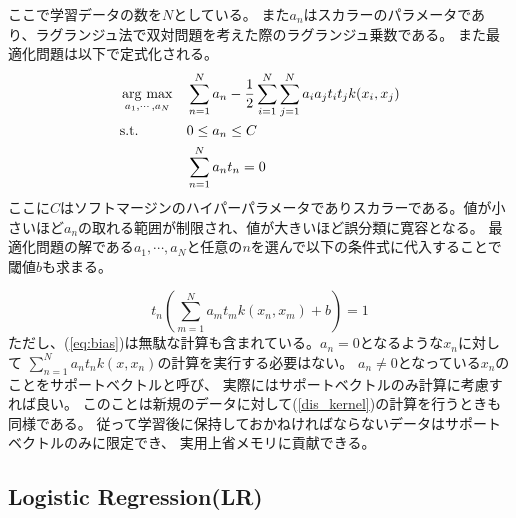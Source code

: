 ここで学習データの数を\(N\)としている。
また\(a_n\)はスカラーのパラメータであり、ラグランジュ法で双対問題を考えた際のラグランジュ乗数である。
また最適化問題は以下で定式化される。
\begin{equation}
    \begin{aligned}
    & \mathop{\rm arg~max}\limits_{a_1,\cdots,a_N}
    & & \sum_{n=1}^N a_n - \frac{1}{2}\sum_{i=1}^N \sum_{j=1}^N a_ia_jt_it_jk(x_i,x_j) \\
    & \text{s.t.}
    & & 0 \leq a_n \leq C  \\
    & & &  \sum_{n=1}^N a_nt_n=0
    \end{aligned}
    \label{eq:kernel SVM}
\end{equation}
ここに\(C\)はソフトマージンのハイパーパラメータでありスカラーである。値が小さいほど\(a_n\)の取れる範囲が制限され、値が大きいほど誤分類に寛容となる。
最適化問題の解である\(a_1,\cdots,a_N\)と任意の\(n\)を選んで以下の条件式に代入することで閾値\(b\)も求まる。

\begin{equation}
    t_n\left( \sum_{m=1}^Na_mt_mk(x_n,x_m) + b \right)=1
    \label{eq:bias}
\end{equation}
ただし、(\ref{eq:bias})は無駄な計算も含まれている。\(a_n=0\)となるような\(x_n\)に対して
\(\sum_{n=1}^Na_nt_nk(x,x_n)\)の計算を実行する必要はない。
\(a_n\neq0\)となっている\(x_n\)のことをサポートベクトルと呼び、
実際にはサポートベクトルのみ計算に考慮すれば良い。
このことは新規のデータに対して(\ref{dis_kernel})の計算を行うときも同様である。
従って学習後に保持しておかねければならないデータはサポートベクトルのみに限定でき、
実用上省メモリに貢献できる。

\subsection{Logistic Regression(LR)}
